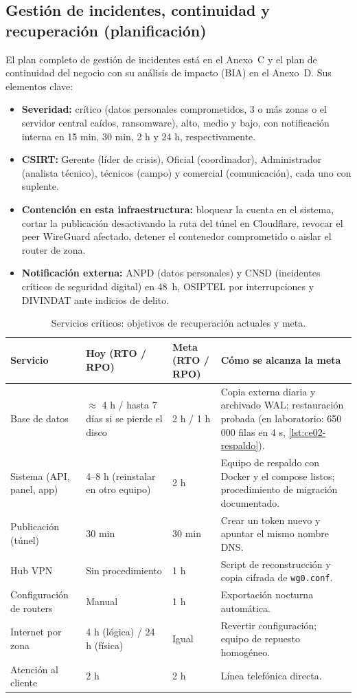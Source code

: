 \subsection{Gestión de incidentes, continuidad y recuperación (planificación)}
\label{sec:ce03-sgsi-incidentes}

El plan completo de gestión de incidentes está en el Anexo~C y el plan de continuidad del
negocio con su análisis de impacto (BIA) en el Anexo~D. Sus elementos clave:

\begin{itemize}
  \item \textbf{Severidad:} crítico (datos personales comprometidos, 3 o más zonas o el
  servidor central caídos, ransomware), alto, medio y bajo, con notificación interna en 15
  min, 30 min, 2 h y 24 h, respectivamente.
  \item \textbf{CSIRT:} Gerente (líder de crisis), Oficial (coordinador), Administrador
  (analista técnico), técnicos (campo) y comercial (comunicación), cada uno con suplente.
  \item \textbf{Contención en esta infraestructura:} bloquear la cuenta en el sistema, cortar
  la publicación desactivando la ruta del túnel en Cloudflare, revocar el peer WireGuard
  afectado, detener el contenedor comprometido o aislar el router de zona.
  \item \textbf{Notificación externa:} ANPD (datos personales) y CNSD (incidentes críticos de
  seguridad digital) en 48~h, OSIPTEL por interrupciones y DIVINDAT ante indicios de delito.
\end{itemize}

\begin{table}[htbp]
\centering
\caption{Servicios críticos: objetivos de recuperación actuales y meta.}
\label{tab:ce03-sgsi-rto}
\small
\begin{tabularx}{\textwidth}{L{3.2cm}L{2.5cm}L{2.3cm}X}
\toprule
\textbf{Servicio} & \textbf{Hoy (RTO / RPO)} & \textbf{Meta (RTO / RPO)} & \textbf{Cómo se alcanza la meta} \\
\midrule
Base de datos & $\approx$ 4 h / hasta 7 días si se pierde el disco & 2 h / 1 h & Copia externa diaria y archivado WAL; restauración probada (en laboratorio: 650\,000 filas en 4 s, \cref{lst:ce02-respaldo}). \\
Sistema (API, panel, app) & 4--8 h (reinstalar en otro equipo) & 2 h & Equipo de respaldo con Docker y el compose listos; procedimiento de migración documentado. \\
Publicación (túnel) & 30 min & 30 min & Crear un token nuevo y apuntar el mismo nombre DNS. \\
Hub VPN & Sin procedimiento & 1 h & Script de reconstrucción y copia cifrada de \texttt{wg0.conf}. \\
Configuración de routers & Manual & 1 h & Exportación nocturna automática. \\
Internet por zona & 4 h (lógica) / 24 h (física) & Igual & Revertir configuración; equipo de repuesto homogéneo. \\
Atención al cliente & 2 h & 2 h & Línea telefónica directa. \\
\bottomrule
\end{tabularx}
\end{table}

